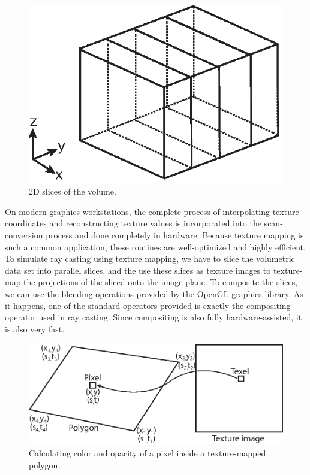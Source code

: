\begin{figure}[th]
\centering
\includegraphics{Figures/2D_slices}
\decoRule
\caption[2D Sclices]{2D slices of the volume.}
\label{fig:2dslices}
\end{figure}
On modern graphics workstations, the complete process of interpolating texture coordinates and reconstructing texture values is incorporated into the scan-conversion process and done completely in hardware. Because texture mapping is such a common application, these routines are well-optimized and highly efficient.
To simulate ray casting using texture mapping, we have to slice the volumetric data set into parallel slices, and the use these slices as texture images to texture-map the projections of the sliced onto the image plane. To composite the slices, we can use the blending operations provided by the OpenGL graphics library. As it happens, one of the standard operators provided is exactly the compositing operator used in ray casting. Since compositing is also fully hardware-assisted, it is also very fast.
\begin{figure}[th]
\centering
\includegraphics{Figures/2dtexmapping}
\decoRule
\caption[2D texture mapping]{Calculating color and opacity of a pixel inside a texture-mapped polygon.}
\label{fig:2dtexture}
\end{figure}

